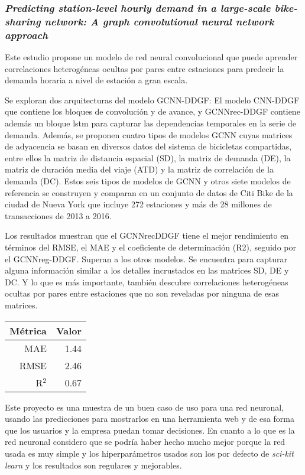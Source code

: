\subsubsection{\textit{Predicting station-level hourly demand in a large-scale bike-sharing network: A graph convolutional neural network approach}}

Este estudio propone un modelo de red neural convolucional que puede aprender correlaciones heterogéneas ocultas por pares entre estaciones para predecir la demanda horaria a nivel de estación a gran escala.
\newline

Se exploran dos arquitecturas del modelo GCNN-DDGF: El modelo CNN-DDGF que contiene los bloques de convolución y de avance, y GCNNrec-DDGF contiene además un bloque \acrshort{lstm} para capturar las dependencias temporales en la serie de demanda. Además, se proponen cuatro tipos de modelos GCNN cuyas matrices de adyacencia se basan en diversos datos del sistema de bicicletas compartidas, entre ellos la matriz de distancia espacial (SD), la matriz de demanda (DE), la matriz de duración media del viaje (ATD) y la matriz de correlación de la demanda (DC). Estos seis tipos de modelos de GCNN y otros siete modelos de referencia se construyen y comparan en un conjunto de datos de Citi Bike de la ciudad de Nueva York que incluye 272 estaciones y más de 28 millones de transacciones de 2013 a 2016.
\newline

Los resultados muestran que el GCNNrecDDGF tiene el mejor rendimiento en términos del RMSE, el MAE y el coeficiente de determinación (R2), seguido por el GCNNreg-DDGF. Superan a los otros modelos. Se encuentra para capturar alguna información similar a los detalles incrustados en las matrices SD, DE y DC. Y lo que es más importante, también descubre correlaciones heterogéneas ocultas por pares entre estaciones que no son reveladas por ninguna de esas matrices.

 
\begin{table}[H]
\centering
\begin{tabular}{rr}
\toprule
 Métrica & Valor \\
\midrule
 MAE &  1.44 \\
 RMSE &  2.46 \\
 R$^2$ &  0.67 \\
\bottomrule
\end{tabular}
\end{table}

Este proyecto es una muestra de un buen caso de uso para una red neuronal, usando las predicciones para mostrarlos en una herramienta web y de esa forma que los usuarios y la empresa puedan tomar decisiones. En cuanto a lo que es la red neuronal considero que se podría haber hecho mucho mejor porque la red usada es muy simple y los hiperparámetros usados son los por defecto de \textit{sci-kit learn} y los resultados son regulares y mejorables.